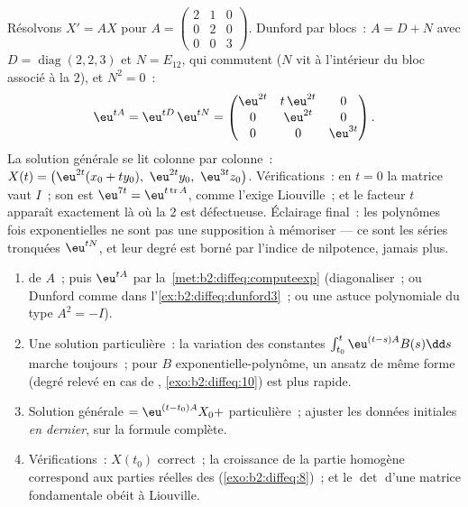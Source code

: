 \begin{example}\label{ex:b2:diffeq:dunford3}
Résolvons $X' = AX$ pour $A = \begin{pmatrix} 2 & 1 & 0\\ 0 & 2 &
0\\ 0 & 0 & 3\end{pmatrix}$. Dunford par blocs~: $A = D + N$
avec $D = \operatorname{diag}(2, 2, 3)$ et $N = E_{12}$, qui
commutent ($N$ vit à l'intérieur du bloc associé à la  $2$), et $N^2 = 0$~:
\[
\eu^{tA} = \eu^{tD}\,\eu^{tN}
= \begin{pmatrix}
\eu^{2t} & t\,\eu^{2t} & 0\\
0 & \eu^{2t} & 0\\
0 & 0 & \eu^{3t}
\end{pmatrix} .
\]
La solution générale se lit colonne par colonne~: $X(t) =
\bigl(\eu^{2t}(x_0 + ty_0),\ \eu^{2t}y_0,\
\eu^{3t}z_0\bigr)$. Vérifications~: en $t = 0$ la matrice vaut
$I$~; son  est $\eu^{7t} =
\eu^{t\operatorname{tr}A}$, comme l'exige Liouville~; et le
facteur $t$ apparaît exactement là où la  $2$ est
défectueuse. Éclairage final~: les polynômes fois exponentielles
ne sont pas une supposition à mémoriser --- ce sont les séries
tronquées $\eu^{tN}$, et leur degré est borné par l'indice de
nilpotence, jamais plus.
\end{example}

\begin{method}[Résoudre $X' = AX + B(t)$, de bout en bout]\label{met:b2:diffeq:solvelinear}
\begin{enumerate}
  \item {} de $A$~; puis $\eu^{tA}$ par
        la~\cref{met:b2:diffeq:computeexp} (diagonaliser~; ou
        Dunford comme dans l'\cref{ex:b2:diffeq:dunford3}~; ou une
        astuce polynomiale du type $A^2 = -I$).
  \item Une solution particulière~: la variation des constantes
        $\int_{t_0}^t\eu^{(t-s)A}B(s)\dd s$ marche toujours~;
        pour $B$ exponentielle-polynôme, un ansatz de même
        forme (degré relevé en cas de ,
        \cref{exo:b2:diffeq:10}) est plus rapide.
  \item Solution générale $= \eu^{(t-t_0)A}X_0 +$ particulière~;
        ajuster les données initiales \emph{en dernier}, sur la
        formule complète.
  \item Vérifications~: $X(t_0)$ correct~; la croissance de la
        partie homogène correspond aux parties réelles des
         (\cref{exo:b2:diffeq:8})~; et le $\det$
        d'une matrice fondamentale obéit à Liouville.
\end{enumerate}
\end{method}

